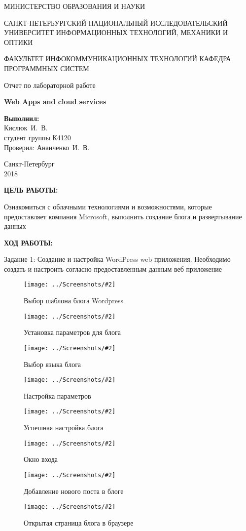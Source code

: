 \documentclass[14pt,a4paper]{extreport}
\newcommand{\screenshot}[2]{\begin{figure}[ht]%
\centering\texttt{[image: ../Screenshots/\#2]}%
\caption{#1}%
\label{picture#2}%
\end{figure}%
}
\newcommand{\header}[1]{%
{
\fontsize{16pt}{14pt}\selectfont
\begin{center}
\textbf{\MakeUppercase{#1}:}
\end{center}
}
}
\newcommand{\prepod}{Ананченко~И.~В.}
\newcommand{\igork}{Кислюк~И.~В.}
\begin{document}
	\begin{titlepage}
	\begin{center}	
		\fontsize{14pt}{14pt}\selectfont
		МИНИСТЕРСТВО ОБРАЗОВАНИЯ И НАУКИ\\

		\vspace*{0.6\baselineskip}
		
		САНКТ-ПЕТЕРБУРГСКИЙ НАЦИОНАЛЬНЫЙ ИССЛЕДОВАТЕЛЬСКИЙ УНИВЕРСИТЕТ ИНФОРМАЦИОННЫХ ТЕХНОЛОГИЙ, МЕХАНИКИ И ОПТИКИ
		
		\vspace*{0.6\baselineskip}
		ФАКУЛЬТЕТ ИНФОКОММУНИКАЦИОННЫХ ТЕХНОЛОГИЙ
		КАФЕДРА ПРОГРАММНЫХ СИСТЕМ
	
		\vspace*{7\baselineskip}
		\fontsize{19pt}{18pt}\selectfont
		Отчет по лабораторной работе
		
		\fontsize{20pt}{18pt}\selectfont
		\textbf{Web Apps and cloud services}\\
		\vspace*{1.15\baselineskip}
		\end{center}
	
	\vspace*{2\baselineskip}
	\begin{flushright}
	\fontsize{14pt}{14pt}\selectfont
	\textbf{Выполнил:}\\
	\igork\\
	студент группы К4120\\
	Проверил: \prepod\\
	\end{flushright}
	
	\vspace{\fill}
	\begin{center}
	Санкт-Петербург\\
	2018
	\end{center}
	
\end{titlepage}

\newpage

\header{Цель работы}

\fontsize{14pt}{14pt}\selectfont

Ознакомиться с облачными технологиями и возможностями, которые предоставляет компания Microsoft, выполнить создание блога и развертывание данных
\clearpage

\header{Ход работы}

Задание 1: Создание и настройка WordPress web приложения. Необходимо создать и настроить согласно предоставленным данным веб приложение
\screenshot{Выбор шаблона блога Wordpress}{1}
\screenshot{Установка параметров для блога}{2}
\screenshot{Выбор языка блога}{3}
\screenshot{Настройка параметров}{4}
\screenshot{Успешная настройка блога}{5}
\screenshot{Окно входа}{6}
\screenshot{Добавление нового поста в блоге}{7}
\screenshot{Открытая страница блога в браузере}{8}
\end{document}
